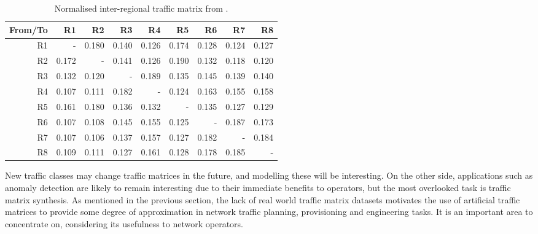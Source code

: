 \begin{table}[!h]
  \centering
  \begin{tabular}{r|rrrrrrrr}
    From/To & R1 & R2 & R3 & R4 & R5 & R6 & R7 & R8 \\
    \hline
    R1 & -     & 0.180 & 0.140 & 0.126 & 0.174 & 0.128 & 0.124 & 0.127 \\
    R2 & 0.172 & -     & 0.141 & 0.126 & 0.190 & 0.132 & 0.118 & 0.120 \\
    R3 & 0.132 & 0.120 & -     & 0.189 & 0.135 & 0.145 & 0.139 & 0.140 \\
    R4 & 0.107 & 0.111 & 0.182 & -     & 0.124 & 0.163 & 0.155 & 0.158 \\
    R5 & 0.161 & 0.180 & 0.136 & 0.132 & -     & 0.135 & 0.127 & 0.129 \\
    R6 & 0.107 & 0.108 & 0.145 & 0.155 & 0.125 & -     & 0.187 & 0.173 \\
    R7 & 0.107 & 0.106 & 0.137 & 0.157 & 0.127 & 0.182 & -     & 0.184 \\
    R8 & 0.109 & 0.111 & 0.127 & 0.161 & 0.128 & 0.178 & 0.185 & - \\
  \end{tabular}
  \caption{Normalised inter-regional traffic matrix from \cite{gerber:03}.}
  \label{tab:cable_tm}
\end{table}


New traffic classes may change traffic matrices in the future, and
modelling these will be interesting. On the other side, applications
such as anomaly detection are likely to remain interesting due to
their immediate benefits to operators, but the most overlooked task is
traffic matrix synthesis. As mentioned in the previous section, the
lack of real world traffic matrix datasets motivates the use of
artificial traffic matrices to provide some degree of approximation in
network traffic planning, provisioning and engineering tasks.  It is
an important area to concentrate on, considering its usefulness to
network operators.

